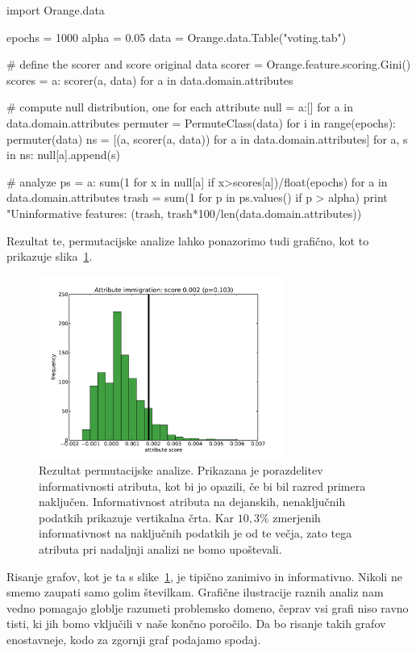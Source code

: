 \begin{python}
import Orange.data

epochs = 1000
alpha = 0.05
data = Orange.data.Table("voting.tab")

# define the scorer and score original data
scorer = Orange.feature.scoring.Gini()
scores = {a: scorer(a, data) for a in data.domain.attributes}

# compute null distribution, one for each attribute
null = {a:[] for a in data.domain.attributes}
permuter = PermuteClass(data)
for i in range(epochs):
    permuter(data)
    ns = [(a, scorer(a, data)) for a in data.domain.attributes]
    for a, s in ns:
        null[a].append(s)

# analyze
ps = {a: sum(1 for x in null[a] if x>scores[a])/float(epochs)
      for a in data.domain.attributes}
trash = sum(1 for p in ps.values() if p > alpha)
print "Uninformative features: %
    (trash, trash*100/len(data.domain.attributes))
\end{python}

Rezultat te, permutacijske analize lahko ponazorimo tudi grafično, kot to prikazuje slika~\ref{f-att-score-null}.

\begin{figure}[htbp]
\begin{center}
\includegraphics[width=8cm]{slike/att-score-null.pdf}
\caption{Rezultat permutacijske analize. Prikazana je porazdelitev informativnosti atributa, kot bi jo opazili, če bi bil razred primera naključen. Informativnost atributa na dejanskih, nenaključnih podatkih prikazuje vertikalna črta. Kar $10,3\%$ zmerjenih informativnost na naključnih podatkih je od te večja, zato tega atributa pri nadaljnji analizi ne bomo upoštevali.}
\label{f-att-score-null}
\end{center}
\end{figure}

Risanje grafov, kot je ta s slike~\ref{f-att-score-null}, je tipično zanimivo in informativno. Nikoli ne smemo zaupati samo golim številkam. Grafične ilustracije raznih analiz nam vedno pomagajo globlje razumeti problemsko domeno, čeprav vsi grafi niso ravno tisti, ki jih bomo vključili v naše končno poročilo. Da bo risanje takih grafov enostavneje, kodo za zgornji graf podajamo spodaj.

